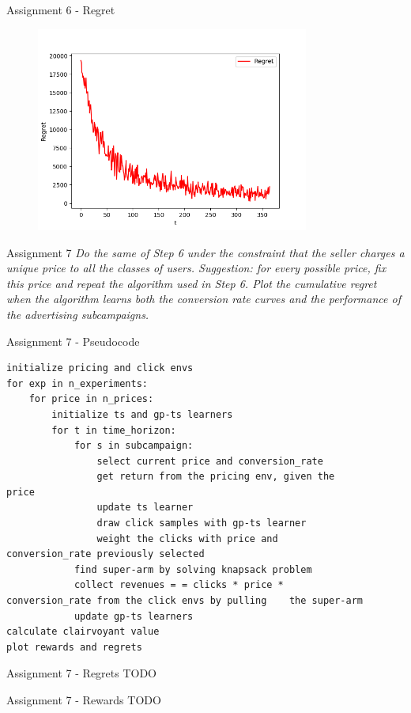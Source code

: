 \documentclass[11pt]{beamer}
\begin{document}
\begin{frame}{Assignment 6 - Regret}
\begin{figure}[hbtp]
\centering
\includegraphics[width=0.8\textwidth]{images/assignment_6_regret.png}
\caption{}
\end{figure}
\end{frame}

\begin{frame}{Assignment 7}
\textit{Do the same of Step 6 under the constraint that the seller charges a unique price to all the classes of users. Suggestion: for every possible price, fix this price and repeat the algorithm used in Step 6. Plot the cumulative regret when the algorithm learns both the conversion rate curves and the performance of the advertising subcampaigns.}
\end{frame}

\begin{frame}[fragile]{Assignment 7 - Pseudocode}
\begin{lstlisting}
initialize pricing and click envs
for exp in n_experiments:
	for price in n_prices:
		initialize ts and gp-ts learners 
		for t in time_horizon:
			for s in subcampaign:
				select current price and conversion_rate 
				get return from the pricing env, given the				price
				update ts learner
				draw click samples with gp-ts learner
				weight the clicks with price and                   conversion_rate previously selected
			find super-arm by solving knapsack problem
			collect revenues = = clicks * price *             conversion_rate from the click envs by pulling    the super-arm
			update gp-ts learners 
calculate clairvoyant value
plot rewards and regrets
\end{lstlisting}
\end{frame}

\begin{frame}{Assignment 7 - Regrets}
TODO
\end{frame}

\begin{frame}{Assignment 7 - Rewards}
TODO
\end{frame}
\end{document}
